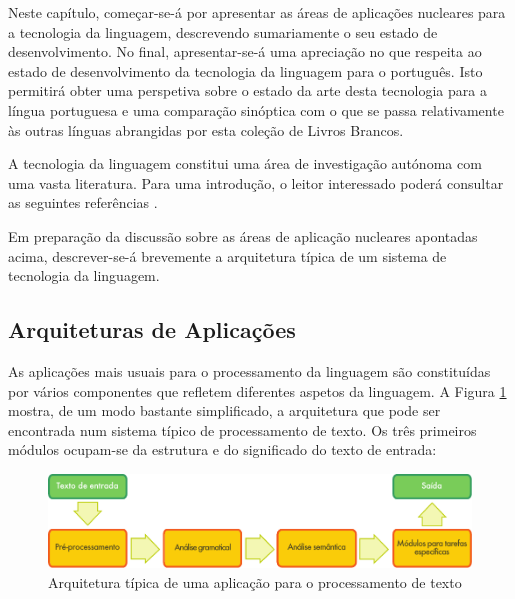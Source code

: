 \begin{multicols}{2}
Neste capítulo, começar-se-á por apresentar as áreas de aplicações nucleares para a tecnologia da linguagem, descrevendo sumariamente o seu estado de desenvolvimento. 
No final, apresentar-se-á uma apreciação no que respeita ao estado de desenvolvimento da tecnologia da linguagem para o português.
Isto permitirá obter uma perspetiva sobre o estado da arte desta tecnologia para a língua portuguesa e uma comparação sinóptica com o que se passa relativamente às outras línguas abrangidas por esta coleção de Livros Brancos.


A tecnologia da linguagem constitui uma área de investigação autónoma com uma vasta literatura. 
Para uma introdução, o leitor interessado poderá consultar as seguintes referências  \cite{jurafsky-martin01, manning-schuetze1, lt-world1, lt-survey1}.

Em preparação da discussão sobre as áreas de aplicação nucleares apontadas acima, 
descrever-se-á brevemente a arquitetura típica de um sistema de tecnologia da linguagem. 

\subsection{Arquiteturas de Aplicações}

 As aplicações mais usuais para o processamento da linguagem são constituídas por vários componentes que refletem diferentes aspetos da linguagem. 
A Figura \ref{fig:textprocessingarch_de} mostra, de um modo bastante simplificado, a arquitetura que pode ser encontrada num sistema típico de processamento de texto. 
Os três primeiros módulos ocupam-se da estrutura e do significado do texto de entrada:

\begin{figure}[htb]
  \center
  \includegraphics[width=\textwidth]{../_media/portuguese/text_processing_app_architecture}
  \caption{Arquitetura típica de uma aplicação para o processamento de texto}
  \label{fig:textprocessingarch_de}
\end{figure}


\end{multicols}
